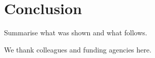 \documentclass[aps,pra,reprint,amsmath,amssymb,superscriptaddress]{revtex4-2}
\begin{document}
\section{Conclusion}
Summarise what was shown and what follows.

\begin{acknowledgments}
We thank colleagues and funding agencies here.
\end{acknowledgments}


\end{document}
